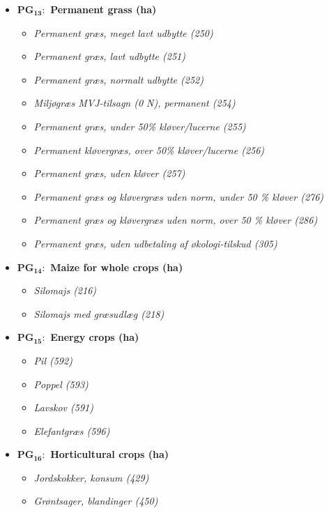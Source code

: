 \documentclass[12pt]{article}
\begin{document}
\begin{itemize}
    \item[] \textbf{PG$_{\textbf{13}}:$ Permanent grass (ha)}
    \begin{itemize}
        \item[$+$] \textit{Permanent græs, meget lavt udbytte (250)}
        \item[$+$] \textit{Permanent græs, lavt udbytte (251)}
        \item[$+$] \textit{Permanent græs, normalt udbytte (252)}
        \item[$+$] \textit{Miljøgræs MVJ-tilsagn (0 N), permanent (254)}
        \item[$+$] \textit{Permanent græs, under 50\% kløver/lucerne (255)}
        \item[$+$] \textit{Permanent kløvergræs, over 50\% kløver/lucerne (256)}
        \item[$+$] \textit{Permanent græs, uden kløver (257)}
        \item[$+$] \textit{Permanent græs og kløvergræs uden norm, under 50 \% kløver (276)}
        \item[$+$] \textit{Permanent græs og kløvergræs uden norm, over 50 \% kløver (286)}
        \item[$+$] \textit{Permanent græs, uden udbetaling af økologi-tilskud (305)}
    \end{itemize}
    \item[] \textbf{PG$_{\textbf{14}}:$ Maize for whole crops (ha)}
    \begin{itemize}
        \item[$+$] \textit{Silomajs (216)}
        \item[$+$] \textit{Silomajs med græsudlæg (218)}
    \end{itemize}
    \item[] \textbf{PG$_{\textbf{15}}:$ Energy crops (ha)}
    \begin{itemize}
        \item[$+$] \textit{Pil (592)}
        \item[$+$] \textit{Poppel (593)}
        \item[$+$] \textit{Lavskov (591)}
        \item[$+$] \textit{Elefantgræs (596)}
    \end{itemize}
    \item[] \textbf{PG$_{\textbf{16}}:$ Horticultural crops (ha)}
    \begin{itemize}
        \item[$+$] \textit{Jordskokker, konsum (429)}
        \item[$+$] \textit{Grøntsager, blandinger (450)}

\end{itemize}
\end{itemize}
\end{document}
